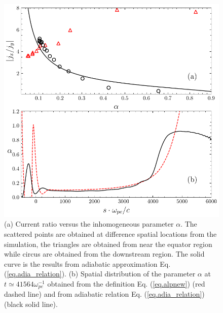 \begin{figure}
    \centering
    \includegraphics[scale=0.5]{img/alpha.pdf}
    \caption{(a) Current ratio versus the inhomogeneous parameter $\alpha$. The scattered points are obtained at difference spatial locations from the simulation, the triangles are obtained from near the equator region while circus are obtained from the downstream region. 
    The solid curve is the results from adiabatic approximation Eq. (\ref{eq.adia_relation}). 
    (b) Spatial distribution   of the parameter $\alpha$ at $t\simeq41564\omega_{pe}^{-1}$ obtained  from the definition  Eq. (\ref{eq.alpnew}) (red dashed line) and  from adiabatic relation Eq. (\ref{eq.adia_relation}) (black solid line).
    }
    \label{fig.adiabatic}
\end{figure}

